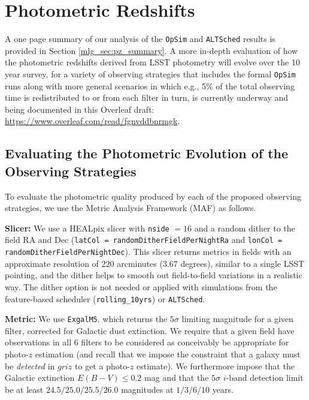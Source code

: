 \section{Photometric Redshifts}\label{sec:pz}

A one page summary of our analysis of the {\tt OpSim} and {\tt ALTSched} results is provided in Section \ref{mlg_sec:pz_summary}. A more in-depth evaluation of how the photometric redshifts derived from LSST photometry will evolve over the 10 year survey, for a variety of observing strategies that includes the formal {\tt OpSim} runs along with more general scenarios in which e.g., 5\% of the total observing time is redistributed to or from each filter in turn, is currently underway and being documented in this Overleaf draft: \url{https://www.overleaf.com/read/fgnvddbnrmgk}.


\subsection{Evaluating the Photometric Evolution of the Observing Strategies}\label{ssec:pz_opsim_phot}

To evaluate the photometric quality produced by each of the proposed observing strategies, we use the Metric Analysis Framework (MAF) as follows.

{\bf Slicer:} We use a HEALpix slicer with {\tt nside} $=16$ and a random dither to the field RA and Dec ({\tt latCol = randomDitherFieldPerNightRa} and {\tt lonCol = randomDitherFieldPerNightDec}). This slicer returns metrics in fields with an approximate resolution of $220$ arcminutes ($3.67$ degrees), similar to a single LSST pointing, and the dither helps to smooth out field-to-field variations in a realistic way. The dither option is not needed or applied with simulations from the feature-based scheduler ({\tt rolling\_10yrs}) or {\tt ALTSched}. 

{\bf Metric:} We use {\tt ExgalM5}, which returns the $5{\sigma}$ limiting magnitude for a given filter, corrected for Galactic dust extinction. We require that a given field have observations in all $6$ filters to be considered as conceivably be appropriate for photo-$z$ estimation (and recall that we impose the constraint that a galaxy must be {\it detected} in $griz$ to get a photo-$z$ estimate). We furthermore impose that the Galactic extinction $E(B-V) \leq 0.2$ mag and that the $5{\sigma}$ $i$-band detection limit be at least $24.5/25.0/25.5/26.0$ magnitudes at $1/3/6/10$ years.

